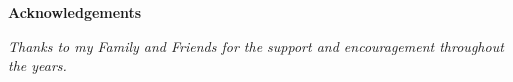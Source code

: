 \thispagestyle{empty}

\begin{center}
  {\bf \Huge Acknowledgements}
\end{center}

\vspace{4cm}


\emph{
  Thanks to my Family and Friends for the support and encouragement throughout the years.\\
}
